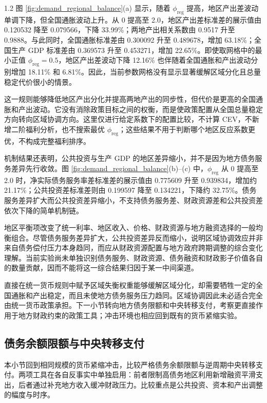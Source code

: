 \documentclass[12pt,UTF8]{ctexart}
\begin{document}
\begin{spacing}{1.2}
		图 \ref{fig:demand_regional_balance}(a) 显示，随着 $\phi_{\mathrm{reg}}$ 提高，地区产出差波动单调下降，但全国通胀波动上升。从 0 提高至 2.0，地区产出差标准差的展示值由 0.120532 降至 0.079566，下降 33.99\%；两地产出相关系数由 0.9517 升至 0.9888。与此同时，全国通胀标准差由 0.300092 升至 0.489678，增加 63.18\%；全国生产 GDP 标准差由 0.369573 升至 0.453271，增加 22.65\%。即使取网格中的最小正值 $\phi_{\mathrm{reg}}=0.5$，地区产出差波动下降 12.16\% 也伴随着全国通胀和产出波动分别增加 18.11\% 和 6.81\%。因此，当前参数网格没有显示显著缓解区域分化且总量稳定代价很小的情景。

		这一规则能够降低地区产出分化并提高两地产出的同步性，但代价是更高的全国通胀和产出波动。它没有消除政策目标之间的权衡，而是使政策配置从全国总量稳定方向转向区域协调方向。这里仅进行给定系数下的配置比较，不计算 CEV，不新增二阶福利分析，也不搜索最优 $\phi_{\mathrm{reg}}$；这些结果不用于判断哪个地区反应系数更优，不构成完整福利排序。

		机制结果还表明，公共投资与生产 GDP 的地区差异缩小，并不是因为地方债务服务差异先行收敛。图 \ref{fig:demand_regional_balance}(b)--(c) 中，$\phi_{\mathrm{reg}}$ 从 0 提高至 2.0 时，净实际债务服务率差标准差的展示值由 0.775609 升至 0.939834，增加约 21.17\%；公共投资差标准差则由 0.199597 降至 0.134221，下降约 32.75\%。债务服务差异扩大而公共投资差异缩小，不支持债务服务差、财政资源差和公共投资差依次下降的简单机制链。

		地区平衡项改变了统一利率、地区收入、价格、财政资源与地方融资选择的一般均衡组合。尽管债务服务差异扩大，公共投资差异反而缩小，说明区域协调效应并非来自债务偿付压力本身趋同，而应从财政资源配置与地方政府跨期调整的综合变化理解。当前实验尚未单独识别债务服务、财政资源、债务融资和财政影子价值各自的数量贡献，因而不能将这一综合结果归因于某一中间渠道。

		直接在统一货币规则中赋予区域失衡权重能够缓解区域分化，却需要牺牲一定的全国通胀和产出稳定，而且未使地方债务服务压力趋同。区域协调因此未必适合完全由统一货币政策承担。下一小节转向地方债务限额和中央转移支付，考察更直接作用于地方财政约束的政策工具；冲击环境也相应回到既有的货币紧缩实验。

		\subsection{债务余额限额与中央转移支付}
		
		本小节回到相同规模的货币紧缩冲击，比较严格债务余额限额与逆周期中央转移支付。两项工具在各自反事实中单独启用：前者限制高债务地区利用新增融资平滑支出，后者通过补充地方收入缓冲财政压力。比较重点是公共投资、资本和产出调整的幅度与时序。
		

\end{spacing}
\end{document}
